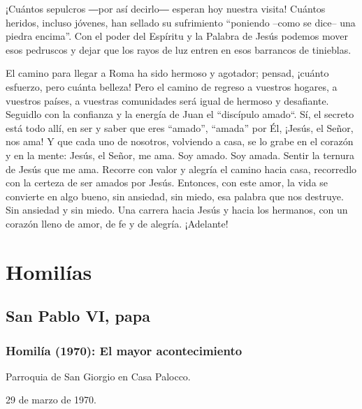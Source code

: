 			\begin{body}¡Cuántos sepulcros ―por así decirlo― esperan hoy nuestra visita! Cuántos heridos, incluso jóvenes, han sellado su sufrimiento “poniendo –como se dice– una piedra encima”. Con el poder del Espíritu y la Palabra de Jesús podemos mover esos pedruscos y dejar que los rayos de luz entren en esos barrancos de tinieblas.\end{body}
			
			\begin{body}El camino para llegar a Roma ha sido hermoso y agotador; pensad, ¡cuánto esfuerzo, pero cuánta belleza! Pero el camino de regreso a vuestros hogares, a vuestros países, a vuestras comunidades será igual de hermoso y desafiante. Seguidlo con la confianza y la energía de Juan el “discípulo amado“. Sí, el secreto está todo allí, en ser y saber que eres “amado”, “amada” por Él, ¡Jesús, el Señor, nos ama! Y que cada uno de nosotros, volviendo a casa, se lo grabe en el corazón y en la mente: Jesús, el Señor, me ama. Soy amado. Soy amada. Sentir la ternura de Jesús que me ama. Recorre con valor y alegría el camino hacia casa, recorredlo con la certeza de ser amados por Jesús. Entonces, con este amor, la vida se convierte en algo bueno, sin ansiedad, sin miedo, esa palabra que nos destruye. Sin ansiedad y sin miedo. Una carrera hacia Jesús y hacia los hermanos, con un corazón lleno de amor, de fe y de alegría. ¡Adelante!\end{body}
			
			\section{Homilías}
			
			\subsection{San Pablo VI, papa}
			
			\subsubsection{Homilía (1970): El mayor acontecimiento}
			
			\begin{referencia}Parroquia de San Giorgio en Casa Palocco.\end{referencia}
			
			\begin{referencia}29 de marzo de 1970.\end{referencia}
			

